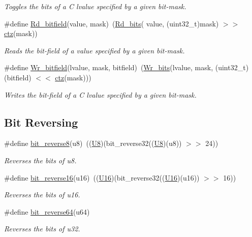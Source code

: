 \begin{DoxyCompactItemize}
\begin{DoxyCompactList}\small\item\em Toggles the bits of a C lvalue specified by a given bit-\/mask. \end{DoxyCompactList}\item 
\#define \hyperlink{group__group__xmega__utils_gaa7ee388a5bd843e5e0ba3d194bc1d8a4}{Rd\-\_\-bitfield}(value, mask)~(\hyperlink{group__group__xmega__utils_ga53d9294b7065346ffa04d7991d2bc31e}{Rd\-\_\-bits}( value, (uint32\-\_\-t)mask) $>$$>$ \hyperlink{clz__ctz_8h_a241e747a4a1dbc730f2ec05b0d0ebd72}{ctz}(mask))
\begin{DoxyCompactList}\small\item\em Reads the bit-\/field of a value specified by a given bit-\/mask. \end{DoxyCompactList}\item 
\#define \hyperlink{group__group__xmega__utils_gaa2ede64db1455ec339cd8a3303647644}{Wr\-\_\-bitfield}(lvalue, mask, bitfield)~(\hyperlink{group__group__xmega__utils_ga97b2bc0b5cdc7ec5293b7a5304cee0f0}{Wr\-\_\-bits}(lvalue, mask, (uint32\-\_\-t)(bitfield) $<$$<$ \hyperlink{clz__ctz_8h_a241e747a4a1dbc730f2ec05b0d0ebd72}{ctz}(mask)))
\begin{DoxyCompactList}\small\item\em Writes the bit-\/field of a C lvalue specified by a given bit-\/mask. \end{DoxyCompactList}\end{DoxyCompactItemize}
\subsection*{Bit Reversing}
\begin{DoxyCompactItemize}
\item 
\#define \hyperlink{group__group__xmega__utils_gaef8832dcae9aaac78c5ebe91fc33084b}{bit\-\_\-reverse8}(u8)~((\hyperlink{group__group__xmega__utils_gaa63ef7b996d5487ce35a5a66601f3e73}{U8})(bit\-\_\-reverse32((\hyperlink{group__group__xmega__utils_gaa63ef7b996d5487ce35a5a66601f3e73}{U8})(u8)) $>$$>$ 24))
\begin{DoxyCompactList}\small\item\em Reverses the bits of {\itshape u8}. \end{DoxyCompactList}\item 
\#define \hyperlink{group__group__xmega__utils_gabab01124189eab03857671c05abfe377}{bit\-\_\-reverse16}(u16)~((\hyperlink{group__group__xmega__utils_ga0a0a322d5fa4a546d293a77ba8b4a71f}{U16})(bit\-\_\-reverse32((\hyperlink{group__group__xmega__utils_ga0a0a322d5fa4a546d293a77ba8b4a71f}{U16})(u16)) $>$$>$ 16))
\begin{DoxyCompactList}\small\item\em Reverses the bits of {\itshape u16}. \end{DoxyCompactList}\item 
\#define \hyperlink{group__group__xmega__utils_ga7f3f2d786440776bab3f688cbd1e8030}{bit\-\_\-reverse64}(u64)
\begin{DoxyCompactList}\small\item\em Reverses the bits of {\itshape u32}. \end{DoxyCompactList}\end{DoxyCompactItemize}
